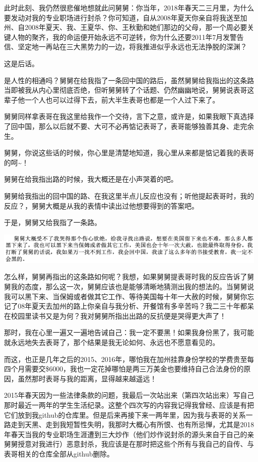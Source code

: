 \documentclass[9pt, b5paper]{article}
\begin{document}
此时此刻、我仍然很悲催地想就此问舅舅：你当年，2018年春天二三月里，为什么要发动对我的专业职场进行封杀？你可知道，自从2008年夏天你亲自将我送至加州、自2008年夏天、我、王夏华、你、王秋勤和她们那边的父母，那一个周必要关键人物的聚齐，我的命运便开始永远不可逆转，你为什么还要2011年7月发警告信、坚定地一再站在三大黑势力的一边，将我推进似乎永远也无法挣脱的深渊？

这是后话。 

是人性的相通吗？舅舅在给我指了一条回中国的路后，虽然舅舅给我指出的这条路当即被我从内心里彻底否绝，但听舅舅转了个话题、仍然幽幽地说，舅舅说表哥这辈子他一个人也可以过得下去，前大半生表哥也都是一个人过下来了。

舅舅同样拿表哥在我这里给我作一个交待，言下之意，或许是，如果我眼下真选择了回中国，那么以后就不要、大可不必再惦记表哥了，表哥能够独善其身、走完余生。 

舅舅，你说这些话的时候，你心里是清楚地知道，我心里从来都是惦记着我的表哥的呵\textasciitilde{}！

舅舅在给我指出路的时候，我大概还是在小声哭着的吧。 

舅舅给我指出的回中国的路、在我这里半点儿反应也没有；听他提起表哥时，我的反应？，舅舅大概是从我的表情中读出过他想要得到的答案吧。 

于是，舅舅又给我指了一条路。 

\begin{center}
\includegraphics[width=.9\linewidth]{./pic/p1p119-5.png}
\end{center}

怎么样，舅舅再指出的这条路如何呢？我想，如果舅舅提表哥时我的反应告诉了舅舅我的态度，那么这一次，舅舅应该也是能够清晰地猜测出我的想法的。当舅舅说我可以黑下来、当保姆或者做其它工作、等待美国每十年一大赦的时候，舅舅你忘记了08年夏天去加州的路上你亲自与我分析、开餐馆有多辛苦吗？我二三十年都呆在校园里读书又是为何？我对舅舅所指出出路的反抗便是哭得更大声了！

那时，我在心里一遍又一遍地告诫自己：我一定不要黑！如果我身份黑了，我可能就永远地失去表哥了，那个结果是我无论如何、永远也不愿意看见的。

而这，也正是几年之后的2015、2016年，哪怕我在加州挂靠身份学校的学费贵至每四个月需要交\$6000，我也一定花掉哪怕是两三万美金也要维持自己合法身份的原因，虽然那时表哥与我的距离，显得越来越遥远！

2015年春天因为一些法律条款的问题，我最后一次站出来（第四次站出来）写自己那时最近一两年的学生生活纪录。这整个四次写的内容我记得我曾经、应该是有把它们放到我github的仓库里。但是后来再接下来一两年里，因为我与表哥的关系一路走到天黑、走到我短暂性失明，我那时大概心有所恨、也有所忌惮，尤其是2018年春天当我的专业职场生涯遭到三大炒作（他们炒作说封杀的源头来自于自己的亲舅舅授意对我进行）恶意封杀，我应该是在那时把这些个所有与我自己的自传、与表哥相关的仓库全部从github删除。
\end{document}
